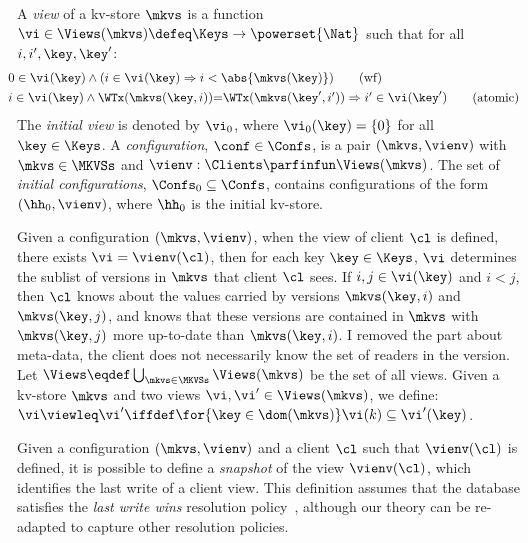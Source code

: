 \begin{definition}[Views]
\label{def:view}
\label{def:cuts}
\label{def:views}
\label{def:configuration}
A \emph{view} of a kv-store $\mkvs$ is a function
$\vi \in \Views(\mkvs) \defeq \Keys \to\powerset{\Nat}$ such that for all $i, i', \key, \key'$:
%
{\small
\begin{align}
    & \hspace*{-8pt}
    0 \in \vi(\key) 
    \wedge (i \in \vi(\key) \Rightarrow i < \abs{ \mkvs(\key) }) 
    \tag{wf}
    \label{eq:view.wf}\\
    & \hspace*{-8pt}
    \begin{array}{@{}l@{}}
	i \in \vi(\key)  
  	\land \WTx(\mkvs(\key, i)) {=} \WTx(\mkvs(\key', i'))  
  	\Rightarrow i' \in \vi(\key')
    \end{array}
	\tag{atomic}
	\label{eq:view.atomic}
\end{align}
}
%
\noindent The \emph{initial view} is denoted by $\vi_{0}$, where $\vi_{0}(\key) = \{0\}$ for all $\key \in \Keys$. 
A \emph{configuration}, $\conf \in \Confs$,  is a pair $ (\mkvs, \vienv)$
with $\mkvs \in \MKVSs$ and
$\vienv : \Clients \parfinfun \Views(\mkvs)$. 
The set of \emph{initial configurations}, $\Confs_0 \subseteq \Confs$, contains configurations of the form $ (\hh_0, \vienv)$, where $\hh_0$ is the initial kv-store. 
\end{definition}
%


Given a configuration $(\mkvs, \vienv)$, when the view of client 
$\cl$ is defined, \ie there exists $\vi = \vienv(\cl)$, then for each key $\key \in \Keys$, 
$\vi$ determines the sublist of versions in $\mkvs$ that client $\cl$ sees. 
If $i,j \in \vi(\key)$ and $i < j$, then $\cl$ knows about the values 
carried by versions $\mkvs(\key, i)$ and  $\mkvs(\key, j)$, 
and  knows that these versions are contained in $\mkvs$ with  $\mkvs(\key, j)$ more 
up-to-date than $\mkvs(\key, i)$. 
\ac{I removed the  part about meta-data, the client does not necessarily know the set of 
readers in the version.}
Let $\Views \eqdef \bigcup_{\mkvs \in \MKVSs} \Views(\mkvs)$ be the set of all views. 
Given a kv-store $\mkvs$ and two views $\vi, \vi' \in \Views(\mkvs)$, 
we define: $\vi \viewleq \vi' \iffdef \for{\key \in \dom(\mkvs)} \vi(k) \subseteq \vi'(\key)$.

Given a configuration $(\mkvs, \vienv)$ and a client $\cl$ such that $\vienv(\cl)$ is
defined, it is possible to define a \emph{snapshot} of the
view $\vienv  (\cl)$, which identifies the last write of a client
view. This definition assumes that the database satisfies the \emph{last write wins}
resolution policy~\cite{framework-concur}, although our theory can be 
re-adapted to capture other resolution policies. 

